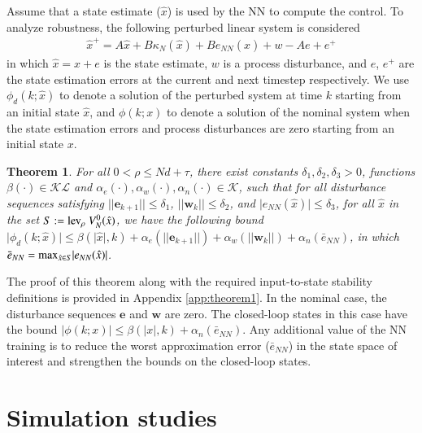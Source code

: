 \documentclass[preprint,5p, twocolumn, authoryear]{elsarticle}
\newtheorem{thm}{Theorem}
\begin{document}
Assume that a state estimate ($\hat{x}$) is
used by the NN to compute the control. 
To analyze robustness, the following perturbed
linear system is considered
\begin{align} \label{eq:perturbed_sys}
    \hat{x}^+ = A\hat{x} + B\kappa_N(\hat{x}) + Be_{NN}(\hat{x}) + w - Ae + e^+
\end{align}
in which $\hat{x} = x + e$ is the state estimate, 
$w$ is a process disturbance, 
and $e$, $e^+$ are the state estimation errors at the 
current and next timestep respectively. 
We use $\phi_d(k;\hat{x})$ to denote a 
solution of the perturbed system 
at time $k$ starting from an initial state $\hat{x}$,
and $\phi(k;x)$ to denote a solution 
of the nominal system when the state estimation errors and process
disturbances are zero starting 
from an initial state $x$.

\begin{thm} \label{thm:nnrobustness}
For all $ 0 < \rho \leq Nd + \tau$, 
there exist constants $\delta_1, \delta_2, \delta_3 > 0$, 
functions $\beta(\cdot) \in \mathcal{K} \mathcal{L}$
and $\alpha_e(\cdot) , \alpha_w(\cdot), \alpha_{n}(\cdot) \in \mathcal{K}$,
such that for all disturbance sequences
satisfying $\vert\vert \mathbf{e}_{k+1} \vert\vert \leq \delta_1$,
$\vert\vert \mathbf{w}_k \vert\vert \leq \delta_2$,
and $\vert e_{NN}(\hat{x}) \vert \leq \delta_3$,
for all $\hat{x}$ in the set $S := \textnormal{lev}_{\rho} \ V_N^0(\hat{x})$,
we have the following bound 
$\vert \phi_d(k; \hat{x}) \vert \leq \beta(\vert \hat{x} \vert, k) 
+ \alpha_e(\vert \vert\mathbf{e}_{k+1} \vert \vert) + 
\alpha_w(\vert \vert \mathbf{w}_k \vert \vert) + 
\alpha_n(\bar{e}_{NN})$, 
in which 
$\bar{e}_{NN} = \textnormal{max}_{\hat{x} \in S} \vert e_{NN}(\hat{x}) \vert$.
\end{thm}

The proof of this theorem along with the required 
input-to-state stability definitions is provided 
in Appendix \ref{app:theorem1}.
In the nominal case, 
the disturbance sequences $\mathbf{e}$ and $\mathbf{w}$ are zero.
The closed-loop states in this case have the bound
$\vert \phi(k; x) \vert \leq \beta(\vert x \vert, k) + 
\alpha_n(\bar{e}_{NN})$. Any additional value of 
the NN training is to reduce the worst 
approximation error ($\bar{e}_{NN}$) 
in the state space of interest and 
strengthen the bounds on the closed-loop states. 

\section{Simulation studies} \label{sec:simulation_studies}
\end{document}
